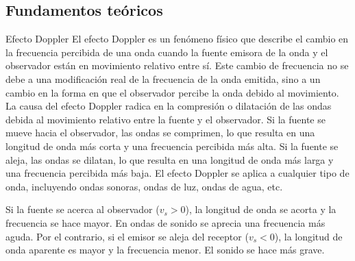 \documentclass[a4paper,11pt]{article}
\begin{document}
\subsection{Fundamentos teóricos}

\begin{referencia}{Efecto Doppler}
El efecto Doppler es un fenómeno físico que describe el cambio en la frecuencia percibida de una onda cuando la fuente emisora de la onda y el observador están en movimiento relativo 
entre sí. Este cambio de frecuencia no se debe a una modificación real de la frecuencia de la 
onda emitida, sino a un cambio en la forma en que el observador percibe la onda debido al 
movimiento. 
La causa del efecto Doppler radica en la compresión o dilatación de las ondas debida al 
movimiento relativo entre la fuente y el observador. Si la fuente se mueve hacia el 
observador, las ondas se comprimen, lo que resulta en una longitud de onda más corta y una 
frecuencia percibida más alta. Si la fuente se aleja, las ondas se dilatan, lo que resulta en una 
longitud de onda más larga y una frecuencia percibida más baja. El efecto Doppler se aplica 
a cualquier tipo de onda, incluyendo ondas sonoras, ondas de luz, ondas de agua, etc. 

Si la fuente se acerca al observador ($v_s>0$), la longitud de onda se acorta y la frecuencia se hace mayor. En ondas de sonido se aprecia una frecuencia más aguda. Por el contrario, si el emisor se aleja del receptor ($v_s<0$), la longitud de onda 
aparente es mayor y la frecuencia menor. El sonido se hace más grave. 
\cite{FV6-ECJ}
\begin{figure}[H]
    \centering
\end{figure}
\end{referencia}
\end{document}
